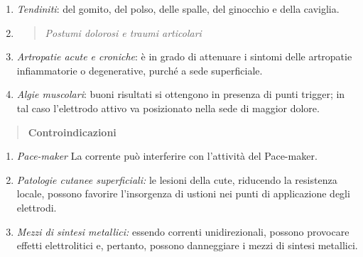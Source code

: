 \documentclass[]{article}
\begin{document}
\begin{enumerate}
\def\labelenumi{\arabic{enumi})}
\item
  \emph{Tendiniti}: del gomito, del polso, delle spalle, del ginocchio e
  della caviglia.
\item
  \begin{quote}
  \emph{Postumi dolorosi e traumi articolari}
  \end{quote}
\item
  \emph{Artropatie acute e croniche}: è in grado di attenuare i sintomi
  delle artropatie infiammatorie o degenerative, purché a sede
  superficiale.
\item
  \emph{Algie muscolari}: buoni risultati si ottengono in presenza di
  punti trigger; in tal caso l'elettrodo attivo va posizionato nella
  sede di maggior dolore.
\end{enumerate}

\begin{quote}
\textbf{Controindicazioni}
\end{quote}

\begin{enumerate}
\def\labelenumi{\arabic{enumi})}
\item
  \emph{Pace-maker} La corrente può interferire con l'attività del
  Pace-maker.
\item
  \emph{Patologie cutanee superficiali:} le lesioni della cute,
  riducendo la resistenza locale, possono favorire l'insorgenza di
  ustioni nei punti di applicazione degli elettrodi.
\item
  \emph{Mezzi di sintesi metallici:} essendo correnti unidirezionali,
  possono provocare effetti elettrolitici e, pertanto, possono
  danneggiare i mezzi di sintesi metallici.
\end{enumerate}
\end{document}
